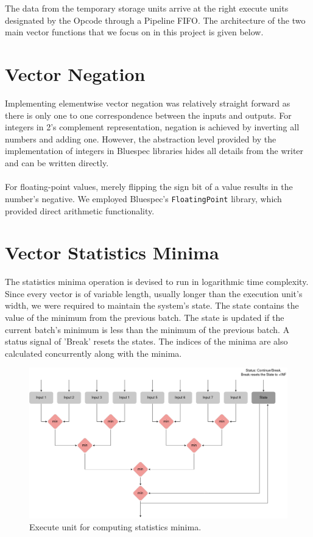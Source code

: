 \begin{paper}
\renewcommand*{\pagemark}{}

\section*{}
The data from the temporary storage units arrive at the right execute units designated by the Opcode through a Pipeline FIFO. The architecture of the two main vector functions that we focus on in this project is given below.
\section*{Vector Negation\sdot}
Implementing elementwise vector negation was relatively straight forward as there is only one to one correspondence between the inputs and outputs. For integers in 2's complement representation, negation is achieved by inverting all numbers and adding one. However, the abstraction level provided by the implementation of integers in Bluespec libraries hides all details from the writer and can be written directly. \\\\
\nointend For floating-point values, merely flipping the sign bit of a value results in the number's negative. We employed Bluespec's \texttt{FloatingPoint} library, which provided direct arithmetic functionality.
\section*{Vector Statistics Minima\sdot}
The statistics minima operation is devised to run in logarithmic time complexity. Since every vector is of variable length, usually longer than the execution unit's width, we were required to maintain the system's state. The state contains the value of the minimum from the previous batch. The state is updated if the current batch's minimum is less than the minimum of the previous batch. A status signal of 'Break' resets the states. The indices of the minima are also calculated concurrently along with the minima.
\begin{figure}[H]
\centering
\includegraphics[width=\textwidth]{Images/VectorExtensions-minima.png}
\caption{\content Execute unit for computing statistics minima.}
\end{figure}


\end{paper}